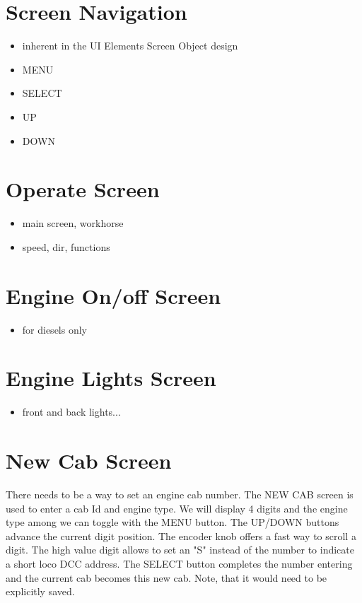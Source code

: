 \section{Screen Navigation}

\begin{itemize}
\item inherent in the UI Elements Screen Object design
\item MENU
\item SELECT
\item UP
\item DOWN
\end{itemize}

\section{Operate Screen}

\begin{itemize}
\item main screen, workhorse
\item speed, dir, functions
\end{itemize}

\section{Engine On/off Screen}

\begin{itemize}
\item for diesels only
\end{itemize}

\section{Engine Lights Screen}

\begin{itemize}
\item front and back lights...
\end{itemize}

\section{New Cab Screen}

There needs to be a way to set an engine cab number. The NEW CAB screen is used to enter a cab Id and engine type. We will display 4 digits and the engine type among we can toggle with the MENU button. The UP/DOWN buttons advance the current digit position. The encoder knob offers a fast way to scroll a digit. The high value digit allows to set an "S" instead of the number to indicate a short loco DCC address. The SELECT button completes the number entering and the current cab becomes this new cab. Note, that it would need to be explicitly saved.

